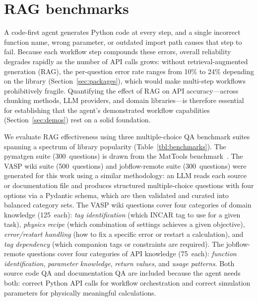 \documentclass{article}
\begin{document}
\section{RAG benchmarks}
\label{sec:benchmarks}

A code-first agent generates Python code at every step, and a single incorrect function name, wrong parameter, or outdated import path causes that step to fail.
Because each workflow step compounds these errors, overall reliability degrades rapidly as the number of API calls grows: without retrieval-augmented generation (RAG), the per-question error rate ranges from 10\% to 24\% depending on the library (Section~\ref{sec:packages}), which would make multi-step workflows prohibitively fragile.
Quantifying the effect of RAG on API accuracy---across chunking methods, LLM providers, and domain libraries---is therefore essential for establishing that the agent's demonstrated workflow capabilities (Section~\ref{sec:demos}) rest on a solid foundation.

We evaluate RAG effectiveness using three multiple-choice QA benchmark suites spanning a spectrum of library popularity (Table~\ref{tbl:benchmarks}).
The pymatgen suite (300~questions) is drawn from the MatTools benchmark~\citep{Liu2025mattools}.
The VASP wiki suite (500~questions) and jobflow-remote suite (300~questions) were generated for this work using a similar methodology: an LLM reads each source or documentation file and produces structured multiple-choice questions with four options via a Pydantic schema, which are then validated and curated into balanced category sets.
The VASP wiki questions cover four categories of domain knowledge (125~each): \emph{tag identification} (which INCAR tag to use for a given task), \emph{physics recipe} (which combination of settings achieves a given objective), \emph{error/restart handling} (how to fix a specific error or restart a calculation), and \emph{tag dependency} (which companion tags or constraints are required).
The jobflow-remote questions cover four categories of API knowledge (75~each): \emph{function identification}, \emph{parameter knowledge}, \emph{return values}, and \emph{usage patterns}.
Both source code QA and documentation QA are included because the agent needs both: correct Python API calls for workflow orchestration and correct simulation parameters for physically meaningful calculations.
\end{document}
